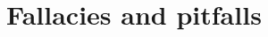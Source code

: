 \begin{enumerate}
%
%
%
%
%
%
\end{enumerate}


\section{~Fallacies and pitfalls }
\label{sec:Induction:FallaciesAndPitfalls} 

